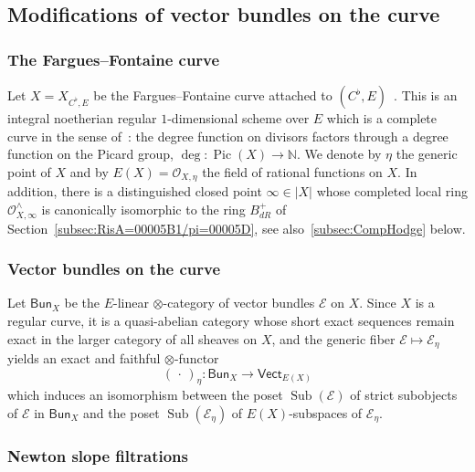 \documentclass[11pt]{article}
\theoremstyle{definition}
\numberwithin{equation}{section}
\numberwithin{figure}{section}
\numberwithin{table}{section}
\newcommand{\Vect}{\mathsf{Vect}}
\newcommand{\Bun}{\mathsf{Bun}}
\DeclareMathOperator{\Sub}{Sub}
\DeclareMathOperator{\Pic}{Pic}
\newcommand*{\dR}{dR}
\begin{document}
\subsection{Modifications of vector bundles on the curve}

\subsubsection{The Fargues--Fontaine curve}\label{subsec:The-Fargues--Fontaine-curve}

Let $X=X_{C^{\flat},E}$ be the Fargues--Fontaine curve attached to $(C^{\flat},E)$~\cite{FaFo15}. This is an integral noetherian regular $1$-dimensional scheme over $E$ which is a complete curve in the sense of~\cite[5.1.3]{FaFo15}: the degree function on divisors factors through a degree function on the Picard group, $\deg:\Pic(X)\rightarrow\mathbb{N}$. We denote by $\eta$ the generic point of $X$ and by $E(X)=\mathcal{O}_{X,\eta}$ the field of rational functions on $X$. In addition, there is a distinguished closed point $\infty\in\left|X\right|$ whose completed local ring $\mathcal{O}_{X,\infty}^{\wedge}$ is canonically isomorphic to the ring $B_{\dR}^{+}$ of Section~\ref{subsec:RisA=00005B1/pi=00005D}, see also~\ref{subsec:CompHodge} below.

\subsubsection{Vector bundles on the curve}

Let $\Bun_{X}$ be the $E$-linear $\otimes$-category of vector bundles $\mathcal{E}$ on $X$. Since $X$ is a regular curve, it is a quasi-abelian category whose short exact sequences remain exact in the larger category of all sheaves on $X$, and the generic fiber $\mathcal{E}\mapsto\mathcal{E}_{\eta}$ yields an exact and faithful $\otimes$-functor
\[
({\,\cdot\,})_{\eta}:\Bun_{X}\rightarrow\Vect_{E(X)}
\]
which induces an isomorphism between the poset $\Sub(\mathcal{E})$ of strict subobjects of $\mathcal{E}$ in $\Bun_{X}$ and the poset $\Sub(\mathcal{E}_{\eta})$ of $E(X)$-subspaces of $\mathcal{E}_{\eta}$.

\subsubsection{Newton slope filtrations}\label{subsec:Newton4BundlesOnCurve}
\end{document}
